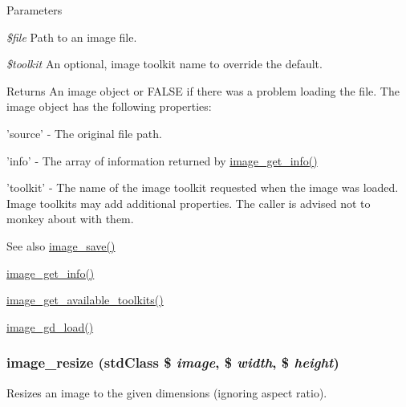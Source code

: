 \begin{DoxyParams}{Parameters}
\item[{\em \$file}]Path to an image file. \item[{\em \$toolkit}]An optional, image toolkit name to override the default.\end{DoxyParams}
\begin{DoxyReturn}{Returns}
An image object or FALSE if there was a problem loading the file. The image object has the following properties:
\begin{DoxyItemize}
\item 'source' -\/ The original file path.
\item 'info' -\/ The array of information returned by \hyperlink{group__image_ga7b2603b2b9d073cc4db9a6200aa9c2a4}{image\_\-get\_\-info()}
\item 'toolkit' -\/ The name of the image toolkit requested when the image was loaded. Image toolkits may add additional properties. The caller is advised not to monkey about with them.
\end{DoxyItemize}
\end{DoxyReturn}
\begin{DoxySeeAlso}{See also}
\hyperlink{group__image_ga134df2e4d035378b52e866618c164f3b}{image\_\-save()} 

\hyperlink{group__image_ga7b2603b2b9d073cc4db9a6200aa9c2a4}{image\_\-get\_\-info()} 

\hyperlink{group__image_ga190b9b90f931916a5766ed11c29b9326}{image\_\-get\_\-available\_\-toolkits()} 

\hyperlink{group__image_gaa3b2912916ff9cfec8c7c8df8f3f1d75}{image\_\-gd\_\-load()} 
\end{DoxySeeAlso}
\hypertarget{group__image_ga991594ed9388b740bc98a162b6bbc449}{
\subsubsection[{image\_\-resize}]{\setlength{\rightskip}{0pt plus 5cm}image\_\-resize (stdClass \$ {\em image}, \/  \$ {\em width}, \/  \$ {\em height})}}
\label{group__image_ga991594ed9388b740bc98a162b6bbc449}
Resizes an image to the given dimensions (ignoring aspect ratio).



